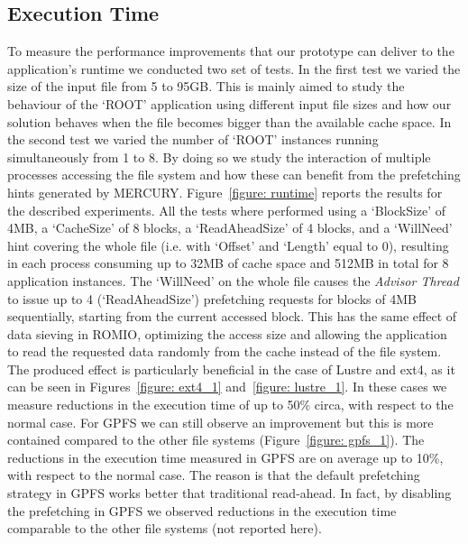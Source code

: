 \subsection{Execution Time}
\label{subsec: results}
To measure the performance improvements that our prototype can deliver to the application's runtime we conducted two set of tests. In the first test we varied the size of the input file from 5 to 95GB. This is mainly aimed to study the behaviour of the `ROOT' application using different input file sizes and how our solution behaves when the file becomes bigger than the available cache space. In the second test we varied the number of `ROOT' instances running simultaneously from 1 to 8. By doing so we study the interaction of multiple processes accessing the file system and how these can benefit from the prefetching hints generated by MERCURY. Figure~\ref{figure: runtime} reports the results for the described experiments. All the tests where performed using a `BlockSize' of 4MB, a `CacheSize' of 8 blocks, a `ReadAheadSize' of 4 blocks, and a `WillNeed' hint covering the whole file (i.e. with `Offset' and `Length' equal to 0), resulting in each process consuming up to 32MB of cache space and 512MB in total for 8 application instances. The `WillNeed' on the whole file causes the \textit{Advisor Thread} to issue up to 4 (`ReadAheadSize') prefetching requests for blocks of 4MB sequentially, starting from the current accessed block. This has the same effect of data sieving in ROMIO, optimizing the access size and allowing the application to read the requested data randomly from the cache instead of the file system. The produced effect is particularly beneficial in the case of Lustre and ext4, as it can be seen in Figures~\ref{figure: ext4_1} and~\ref{figure: lustre_1}. In these cases we measure reductions in the execution time of up to 50\% circa, with respect to the normal case. For GPFS we can still observe an improvement but this is more contained compared to the other file systems (Figure~\ref{figure: gpfs_1}). The reductions in the execution time measured in GPFS are on average up to 10\%, with respect to the normal case. The reason is that the default prefetching strategy in GPFS works better that traditional read-ahead. In fact, by disabling the prefetching in GPFS we observed reductions in the execution time comparable to the other file systems (not reported here).

